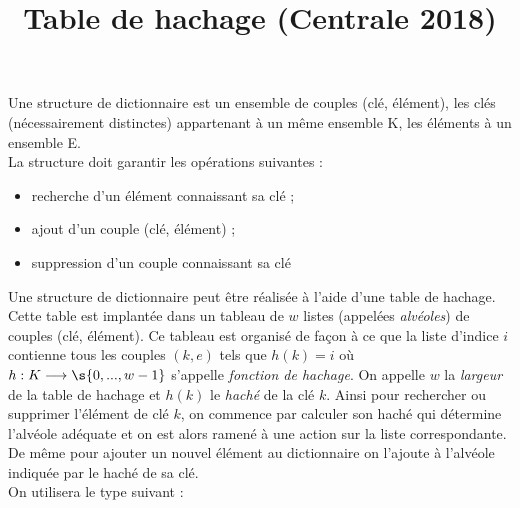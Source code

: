 \documentclass[10pt,a4paper, varwidth]{article}
\begin{document}
	\title{Table de hachage (Centrale 2018)}
	\date{\empty}
	\maketitle
	
	Une structure de dictionnaire est un ensemble de couples (clé, élément), les clés (nécessairement distinctes)
	appartenant à un même ensemble K, les éléments à un ensemble E.\\
	La structure doit garantir les opérations
	suivantes :
	\begin{itemize}
		\item recherche d'un élément connaissant sa clé ;
		\item ajout d'un couple (clé, élément) ;
		\item suppression d'un couple connaissant sa clé
	\end{itemize}
	Une structure de dictionnaire peut être réalisée à l'aide d'une table de hachage. Cette table est implantée dans
	un tableau de $w$ listes (appelées \textit{alvéoles}) de couples (clé, élément). Ce tableau est organisé de façon à ce que la
	liste d'indice $i$ contienne tous les couples $(k, e)$ tels que $h(k) = i$ où $h : K \longrightarrow \s{0, ..., w - 1}$ s'appelle \textit{fonction de
	hachage}. On appelle $w$ la \textit{largeur} de la table de hachage et $h(k)$ le \textit{haché} de la clé $k$.
	Ainsi pour rechercher ou supprimer l'élément de clé $k$, on commence par calculer son haché qui détermine
	l'alvéole adéquate et on est alors ramené à une action sur la liste correspondante. De même pour ajouter un
	nouvel élément au dictionnaire on l'ajoute à l'alvéole indiquée par le haché de sa clé.\\
	On utilisera le type suivant :\\
	
\end{document}
